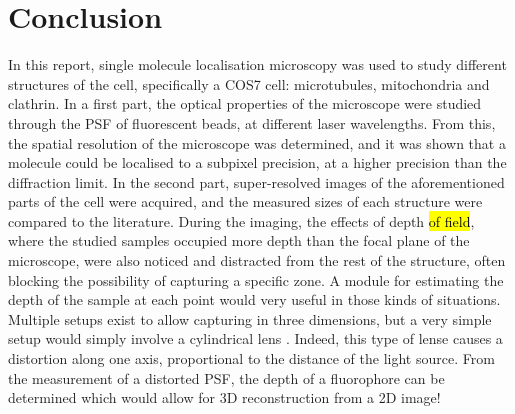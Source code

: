 \section{Conclusion}
In this report, single molecule localisation microscopy was used to study different structures of the cell, specifically a COS7 cell: microtubules, mitochondria and clathrin. In a first part, the optical properties of the microscope were studied through the PSF of fluorescent beads, at different laser wavelengths. From this, the spatial resolution of the microscope was determined, and it was shown that a molecule could be localised to a subpixel precision, at a higher precision than the diffraction limit. In the second part, super-resolved images of the aforementioned parts of the cell were acquired, and the measured sizes of each structure were compared to the literature.
During the imaging, the effects of depth \hl{of field}, where the studied samples occupied more depth than the focal plane of the microscope, were also noticed and distracted from the rest of the structure, often blocking the possibility of capturing a specific zone. A module for estimating the depth of the sample at each point would very useful in those kinds of situations. Multiple setups exist to allow capturing in three dimensions, but a very simple setup would simply involve a cylindrical lens \cite{jimenez_about_2020}. Indeed, this type of lense causes a distortion along one axis, proportional to the distance of the light source. From the measurement of a distorted PSF, the depth of a fluorophore can be determined which would allow for 3D reconstruction from a 2D image!